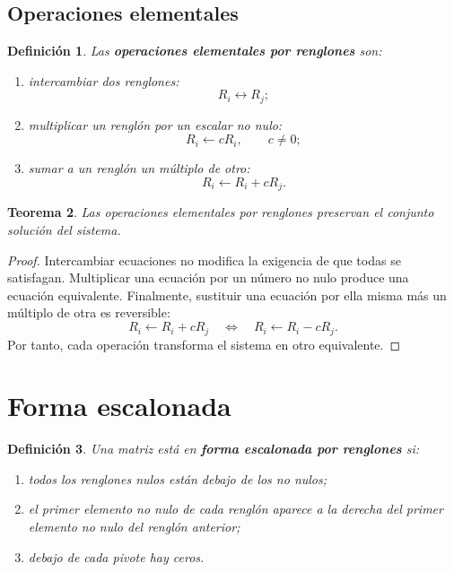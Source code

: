 \documentclass[12pt]{article}
\newtheorem{definicion}{Definición}[section]
\newtheorem{teorema}[definicion]{Teorema}
\theoremstyle{remark}
\begin{document}
\subsection{Operaciones elementales}

\begin{definicion}
Las \textbf{operaciones elementales por renglones} son:
\begin{enumerate}
\item intercambiar dos renglones:
\[
R_i\leftrightarrow R_j;
\]
\item multiplicar un renglón por un escalar no nulo:
\[
R_i\leftarrow cR_i,\qquad c\neq0;
\]
\item sumar a un renglón un múltiplo de otro:
\[
R_i\leftarrow R_i+cR_j.
\]
\end{enumerate}
\end{definicion}

\begin{teorema}
Las operaciones elementales por renglones preservan el conjunto solución del sistema.
\end{teorema}

\begin{proof}
Intercambiar ecuaciones no modifica la exigencia de que todas se satisfagan. Multiplicar una ecuación
por un número no nulo produce una ecuación equivalente. Finalmente, sustituir una ecuación por ella
misma más un múltiplo de otra es reversible:
\[
R_i\leftarrow R_i+cR_j
\quad\Longleftrightarrow\quad
R_i\leftarrow R_i-cR_j.
\]
Por tanto, cada operación transforma el sistema en otro equivalente.
\end{proof}

\section{Forma escalonada}

\begin{definicion}
Una matriz está en \textbf{forma escalonada por renglones} si:
\begin{enumerate}
\item todos los renglones nulos están debajo de los no nulos;
\item el primer elemento no nulo de cada renglón aparece a la derecha del primer elemento no nulo
del renglón anterior;
\item debajo de cada pivote hay ceros.
\end{enumerate}
\end{definicion}
\end{document}
